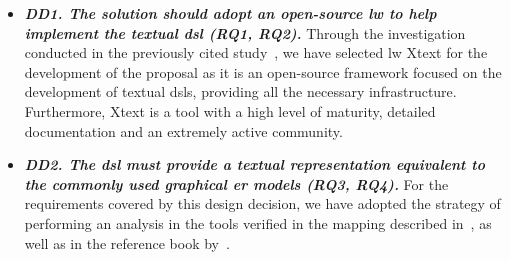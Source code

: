 \begin{itemize}
    \item\textit{\textbf{DD1. The solution should adopt an open-source \ac{lw} to help implement the textual \ac{dsl} (RQ1, RQ2).}}
     Through the investigation conducted in the previously cited study~\cite{Lopes:2019}, we have selected \ac{lw} Xtext for the development of the proposal as it is an open-source framework focused on the development of textual \acp{dsl}, providing all the necessary infrastructure.
     Furthermore, Xtext is a tool with a high level of maturity, detailed documentation and an extremely active community.
    
    \item\textit{\textbf{DD2. The \ac{dsl} must provide a textual representation equivalent to the commonly used graphical \ac{er} models (RQ3, RQ4).}}
    For the requirements covered by this design decision, we have adopted the strategy of performing an analysis in the tools verified in the mapping described in~\cite{Lopes:2019}, as well as in the reference book by~\cite{Heuser:2009}.
    

\end{itemize}
